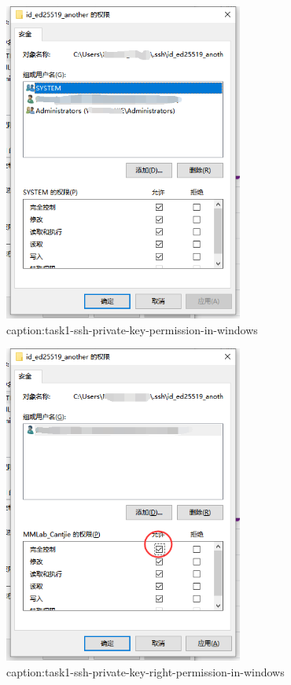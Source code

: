 \begin{figure}[htbp]
	\centering
	\includegraphics[width=0.7\textwidth]{figures/task1-ssh-private-key-permission-in-windows.png}
	\caption{caption:task1-ssh-private-key-permission-in-windows}
	\label{fig:task1-ssh-private-key-permission-in-windows}
\end{figure}


\begin{figure}[htbp]
	\centering
	\includegraphics[width=0.7\textwidth]{figures/task1-ssh-private-key-right-permission-in-windows.png}
	\caption{caption:task1-ssh-private-key-right-permission-in-windows}
	\label{fig:task1-ssh-private-key-right-permission-in-windows}
\end{figure}